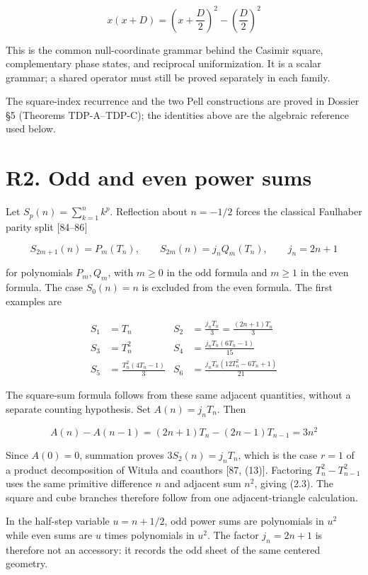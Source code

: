 \documentclass[
  11pt,
]{book}
\begin{document}
\[
x(x+D)=\left(x+\frac D2\right)^2-\left(\frac D2\right)^2
\]

This is the common null-coordinate grammar behind the Casimir square,
complementary phase states, and reciprocal uniformization. It is a
scalar grammar; a shared operator must still be proved separately in
each family.

The square-index recurrence and the two Pell constructions are proved in
Dossier §5 (Theorems TDP-A--TDP-C); the identities above are the
algebraic reference used below.

\section{R2. Odd and even power sums}\label{r2.-odd-and-even-power-sums}

Let \(S_p(n)=\sum_{k=1}^n k^p\). Reflection about \(n=-1/2\) forces the
classical Faulhaber parity split {[}84--86{]}

\[
\boxed{
S_{2m+1}(n)=P_m(T_n),\qquad
S_{2m}(n)=j_nQ_m(T_n),\qquad j_n=2n+1}
\tag{2.1}
\]

for polynomials \(P_m,Q_m\), with \(m\ge0\) in the odd formula and
\(m\ge1\) in the even formula. The case \(S_0(n)=n\) is excluded from
the even formula. The first examples are

\[
\begin{aligned}
S_1&=T_n
&S_2&=\frac{j_nT_n}{3}=\frac{(2n+1)T_n}{3}\\
S_3&=T_n^2
&S_4&=\frac{j_nT_n(6T_n-1)}{15}\\
S_5&=\frac{T_n^2(4T_n-1)}3
&S_6&=\frac{j_nT_n(12T_n^2-6T_n+1)}{21}
\end{aligned}
\tag{2.2}
\]

The square-sum formula follows from these same adjacent quantities,
without a separate counting hypothesis. Set \(A(n)=j_nT_n\). Then

\[
A(n)-A(n-1)=(2n+1)T_n-(2n-1)T_{n-1}=3n^2
\tag{2.2a}
\]

Since \(A(0)=0\), summation proves \(3S_2(n)=j_nT_n\), which is the case
\(r=1\) of a product decomposition of Wituła and coauthors {[}87,
(13){]}. Factoring \(T_n^2-T_{n-1}^2\) uses the same primitive
difference \(n\) and adjacent sum \(n^2\), giving (2.3). The square and
cube branches therefore follow from one adjacent-triangle calculation.

In the half-step variable \(u=n+1/2\), odd power sums are polynomials in
\(u^2\) while even sums are \(u\) times polynomials in \(u^2\). The
factor \(j_n=2n+1\) is therefore not an accessory: it records the odd
sheet of the same centered geometry.
\end{document}
